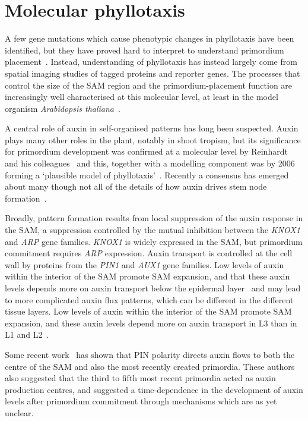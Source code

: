 \section{Molecular phyllotaxis}

A few gene mutations which cause phenotypic changes in phyllotaxis have been identified, but they have proved hard to interpret to understand primordium placement~\cite{kuhlemeierPhyllotaxis2017}. Instead,  understanding of phyllotaxis has instead largely come from spatial imaging studies of tagged proteins and  reporter genes. The processes that control the size of the SAM region and the primordium-placement function are increasingly well characterised at this molecular level, at least in the model organism \textit{Arabidopsis thaliana}~\cite{galvan-ampudiaTemporalIntegrationAuxin2020,cronkMolecularOrganographyPlants2009}.

 A central role of auxin in self-organised patterns has long been suspected.  Auxin plays many other roles in the plant, notably in shoot tropism, but its significance for primordium development was confirmed at a molecular level by Reinhardt and his colleagues~\autocite{reinhardtRegulationPhyllotaxisPolar2003} and this, together with a modelling component was by 2006 forming a `plausible model of phyllotaxis'~\cite{smithPlausibleModelPhyllotaxis2006}. Recently a consensus has emerged about many though not all of the details of how auxin drives stem node formation~\autocite{shiPatterningShootApical2019}.

	 Broadly, pattern formation results from local suppression of the auxin response in the SAM, a suppression controlled by the mutual inhibition between the \textit{KNOX1} and \textit{ARP} gene families. \textit{KNOX1} is widely expressed in the SAM, but primordium commitment requires \textit{ARP} expression. Auxin transport is controlled at the cell wall by proteins from the \textit{PIN1} and \textit{AUX1} gene families.  Low levels of auxin within the interior of the SAM promote SAM expansion, and that these auxin levels depends more on auxin transport below the epidermal layer~\autocite{shiFeedbackLateralOrgans2018} and may lead to more complicated auxin flux patterns, which can be different in the different tissue layers. Low levels of auxin within the interior of the SAM promote SAM expansion, and these auxin levels depend more on auxin transport in L3 than in L1 and L2~\autocite{shiFeedbackLateralOrgans2018,shiPatterningShootApical2019}.


Some recent work~\autocite{galvan-ampudiaTemporalIntegrationAuxin2020} has shown that PIN polarity directs auxin flows to both the centre of the SAM and also the most recently created primordia. These authors also suggested that the third to fifth most recent primordia acted as auxin production centres, and suggested a time-dependence in the  development of auxin levels after primordium commitment through mechanisms which are as yet unclear. 

